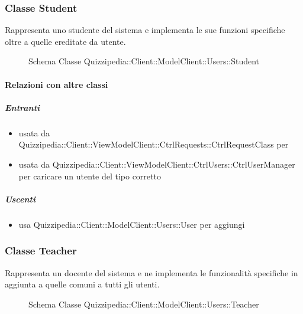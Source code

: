 \subsubsection{Classe Student}
Rappresenta uno studente del sistema e implementa le sue funzioni specifiche oltre a quelle ereditate da utente.
\begin{figure}[H]
\centering
\noindent{}
\caption[Schema Classe Student]{Schema Classe Quizzipedia::Client::ModelClient::Users::Student}
\end{figure}
\paragraph{Relazioni con altre classi}
\subparagraph{Entranti}
\begin{itemize}
\item usata da Quizzipedia::Client::ViewModelClient::CtrlRequests::CtrlRequestClass per 
\item usata da Quizzipedia::Client::ViewModelClient::CtrlUsers::CtrlUserManager per caricare un utente del tipo corretto
\end{itemize}
\subparagraph{Uscenti}
\begin{itemize}
\item usa Quizzipedia::Client::ModelClient::Users::User per aggiungi
\end{itemize}
\subsubsection{Classe Teacher}
Rappresenta un docente del sistema e ne implementa le funzionalità specifiche in aggiunta a quelle comuni a tutti gli utenti.
\begin{figure}[H]
\centering
\noindent{}
\caption[Schema Classe Teacher]{Schema Classe Quizzipedia::Client::ModelClient::Users::Teacher}
\end{figure}
